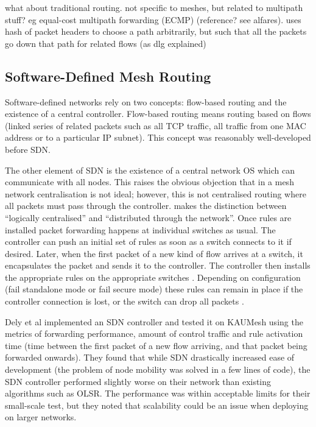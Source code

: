 what about traditional routing. not specific to meshes, but related to multipath stuff? eg equal-cost multipath forwarding (ECMP) (reference? see alfares). uses hash of packet headers to choose a path arbitrarily, but such that all the packets go down that path for related flows (as dlg explained) \cite{alfares:hedera}

\subsection{Software-Defined Mesh Routing}
Software-defined networks rely on two concepts: flow-based routing and the existence of a central controller. Flow-based routing means routing based on flows (linked series of related packets such as all TCP traffic, all traffic from one MAC address or to a particular IP subnet). This concept was reasonably well-developed \cite{wellons:oblivious,wang:routing} before SDN.

The other element of SDN is the existence of a central network OS which can communicate with all nodes. This raises the obvious objection that in a mesh network centralisation is not ideal; however, this is not centralised routing where all packets must pass through the controller. \cite{handigol:asterix} makes the distinction between ``logically centralised'' and ``distributed through the network''. Once rules are installed packet forwarding happens at individual switches as usual. The controller can push an initial set of rules as soon as a switch connects to it if desired. Later, when the first packet of a new kind of flow arrives at a switch, it encapsulates the packet and sends it to the controller. The controller then installs the appropriate rules on the appropriate switches \cite{mckeown:sdn}. Depending on configuration (fail standalone mode or fail secure mode) these rules can remain in place if the controller connection is lost, or the switch can drop all packets \cite{onf:switch140}.

Dely et al \cite{dely:wmn} implemented an SDN controller and tested it on KAUMesh using the metrics of forwarding performance, amount of control traffic and rule activation time (time between the first packet of a new flow arriving, and that packet being forwarded onwards). They found that while SDN drastically increased ease of development (the problem of node mobility was solved in a few lines of code), the SDN controller performed slightly worse on their network than existing algorithms such as OLSR. The performance was within acceptable limits for their small-scale test, but they noted that scalability could be an issue when deploying on larger networks.

